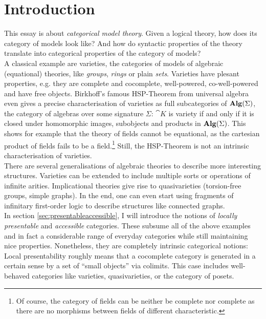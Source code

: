 \section*{Introduction}
{}

This essay is about \emph{categorical model theory}. Given a logical theory, how does its category of models look like? And how do syntactic properties of the theory translate into categorical properties of the category of models? \\

A classical example are varieties, the categories of models of algebraic (equational) theories, like \emph{groups}, \emph{rings} or plain \emph{sets}. Varieties have plesant properties, e.g. they are complete and cocomplete, well-powered, co-well-powered and have free objects. Birkhoff's famous HSP-Theorem from universal algebra even gives a precise characterisation of varieties as full subcategories of $\mathbf{Alg}(\Sigma)$, the category of algebras over some signature $\Sigma$: $\cat K$ is variety if and only if it is closed under homomorphic images, subobjects and products in $\mathbf{Alg}(\Sigma)$. 
This shows for example that the theory of fields cannot be equational, as the cartesian product of fields fails to be a field.\footnote{Of course, the category of fields can be neither be complete nor complete as there are no morphisms between fields of different characteristic.}
Still, the HSP-Theorem is not an intrinsic characterisation of varieties. \\

There are several generalisations of algebraic theories to describe more interesting structures. Varieties can be extended to include multiple sorts or operations of infinite arities. Implicational theories give rise to quasivarieties (torsion-free groups, simple graphs). In the end, one can even start using fragments of infinitary first-order logic to describe structures like connected graphs. \\

In section \ref{sec:presentableaccessible}, I will introduce the notions of \emph{locally presentable} and \emph{accessible} categories. These subsume all of the above examples and in fact a considerable range of everyday categories while still maintaining nice properties. Nonetheless, they are completely intrinsic categorical notions: Local presentability roughly means that a cocomplete category is generated in a certain sense by a set of ``small objects'' via colimits. This case includes well-behaved categories like varieties, quasivarieties, or the category of posets. \\

